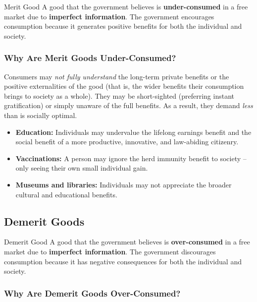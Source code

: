 \documentclass[11pt, a4paper, twoside]{book}
\begin{document}
\begin{keyterm}{Merit Good}
A good that the government believes is \textbf{under-consumed} in a free market due to \textbf{imperfect information}. The government encourages consumption because it generates positive benefits for both the individual and society.
\end{keyterm}

\subsubsection{Why Are Merit Goods Under-Consumed?}

Consumers may \emph{not fully understand} the long-term private benefits or the positive externalities of the good (that is, the wider benefits their consumption brings to society as a whole). They may be short-sighted (preferring instant gratification) or simply unaware of the full benefits. As a result, they demand \emph{less} than is socially optimal.

\begin{example}
\begin{itemize}
  \item \textbf{Education:} Individuals may undervalue the lifelong earnings benefit and the social benefit of a more productive, innovative, and law-abiding citizenry.
  \item \textbf{Vaccinations:} A person may ignore the herd immunity benefit to society -- only seeing their own small individual gain.
  \item \textbf{Museums and libraries:} Individuals may not appreciate the broader cultural and educational benefits.
\end{itemize}
\end{example}

\subsection{Demerit Goods}

\begin{keyterm}{Demerit Good}
A good that the government believes is \textbf{over-consumed} in a free market due to \textbf{imperfect information}. The government discourages consumption because it has negative consequences for both the individual and society.
\end{keyterm}

\subsubsection{Why Are Demerit Goods Over-Consumed?}
\end{document}
